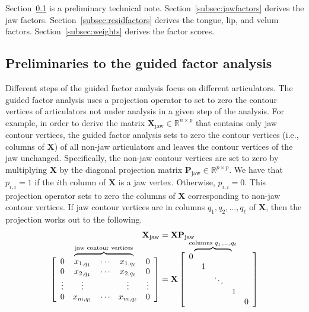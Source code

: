 \documentclass[preprint]{JASAnew}\usepackage[]{graphicx}\usepackage[]{color}
\newcommand\bovermat[2]{%
  \makebox[0pt][l]{$\smash{\overbrace{\phantom{%
    \begin{matrix}#2\end{matrix}}}^{#1}}$}#2}
\begin{document}
Section~\ref{subsec:preliminaries} is a preliminary technical note. Section~\ref{subsec:jawfactors} derives the jaw factors. Section~\ref{subsec:residfactors} derives the tongue, lip, and velum factors. Section~\ref{subsec:weights} derives the factor scores. 





\subsection{Preliminaries to the guided factor analysis}
\label{subsec:preliminaries}

Different steps of the guided factor analysis focus on different articulators.
%
The guided factor analysis uses a projection operator to set to zero the contour vertices of articulators not under analysis in a given step of the analysis.
% 
For example, in order to derive the matrix $\mathbf{X}_\text{jaw} \in \mathbb{R}^{n\times p}$ that contains only jaw contour vertices, the guided factor analysis sets to zero the contour vertices (i.e., columns of $\mathbf{X}$) of all non-jaw articulators and leaves the contour vertices of the jaw unchanged. 
%
Specifically, the non-jaw contour vertices are set to zero by multiplying $\mathbf{X}$  
% 
by the diagonal projection matrix $\mathbf{P}_\text{jaw} \in \mathbb{R}^{p\times p}$. 
% 
We have that $p_{i,i}=1$ if the $i$th column of $\mathbf{X}$ is a jaw vertex. Otherwise, $p_{i,i}=0$. 
% 
This projection operator sets to zero the columns of $\mathbf{X}$ corresponding to non-jaw contour vertices. 
% 
If jaw contour vertices are in columns $q_1,q_2,\ldots,q_\ell$ of $\mathbf{X}$, then the projection works out to the following. 
% 
\begin{equation}
\begin{split}
  \mathbf{X}_\text{jaw} &= \mathbf{X} \mathbf{P}_\text{jaw} \\[10pt]
%
  \left[ {\begin{array}{ccccc}
   0 & \bovermat{\text{jaw contour vertices}}{x_{1,q_1} &  \cdots & x_{1,q_\ell}} & 0 \\
   0 & x_{2,q_1} &  \cdots & x_{2,q_\ell} & 0 \\
   \vdots & \vdots & & \vdots & \vdots \\
   0 & x_{m,q_1} & \cdots & x_{m,q_\ell} & 0 \\
  \end{array} } \right]
%
  &= 
%
   \mathbf{X}
%
   \left[ {\begin{array}{ccccc}
   \bovermat{\text{columns } q_1,\ldots,q_\ell}{0&&&&}\\
   & 1 &&&\\
   && \ddots &&\\
   &&& 1 &\\
   &&&& 0 \\
  \end{array} } \right]
\end{split}
\end{equation}
\end{document}

